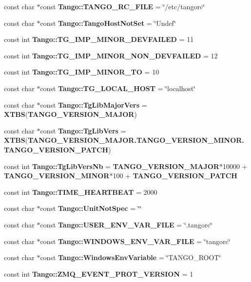 \begin{DoxyCompactItemize}
\item 
const char $\ast$const {\bf Tango\-::\-T\-A\-N\-G\-O\-\_\-\-R\-C\-\_\-\-F\-I\-L\-E} = \char`\"{}/etc/tangorc\char`\"{}
\item 
const char $\ast$const {\bf Tango\-::\-Tango\-Host\-Not\-Set} = \char`\"{}Undef\char`\"{}
\item 
const int {\bf Tango\-::\-T\-G\-\_\-\-I\-M\-P\-\_\-\-M\-I\-N\-O\-R\-\_\-\-D\-E\-V\-F\-A\-I\-L\-E\-D} = 11
\item 
const int {\bf Tango\-::\-T\-G\-\_\-\-I\-M\-P\-\_\-\-M\-I\-N\-O\-R\-\_\-\-N\-O\-N\-\_\-\-D\-E\-V\-F\-A\-I\-L\-E\-D} = 12
\item 
const int {\bf Tango\-::\-T\-G\-\_\-\-I\-M\-P\-\_\-\-M\-I\-N\-O\-R\-\_\-\-T\-O} = 10
\item 
const char $\ast$const {\bf Tango\-::\-T\-G\-\_\-\-L\-O\-C\-A\-L\-\_\-\-H\-O\-S\-T} = \char`\"{}localhost\char`\"{}
\item 
const char $\ast$const {\bf Tango\-::\-Tg\-Lib\-Major\-Vers} = {\bf X\-T\-B\-S}({\bf T\-A\-N\-G\-O\-\_\-\-V\-E\-R\-S\-I\-O\-N\-\_\-\-M\-A\-J\-O\-R})
\item 
const char $\ast$const {\bf Tango\-::\-Tg\-Lib\-Vers} = {\bf X\-T\-B\-S}({\bf T\-A\-N\-G\-O\-\_\-\-V\-E\-R\-S\-I\-O\-N\-\_\-\-M\-A\-J\-O\-R.\-T\-A\-N\-G\-O\-\_\-\-V\-E\-R\-S\-I\-O\-N\-\_\-\-M\-I\-N\-O\-R.\-T\-A\-N\-G\-O\-\_\-\-V\-E\-R\-S\-I\-O\-N\-\_\-\-P\-A\-T\-C\-H})
\item 
const int {\bf Tango\-::\-Tg\-Lib\-Vers\-Nb} = {\bf T\-A\-N\-G\-O\-\_\-\-V\-E\-R\-S\-I\-O\-N\-\_\-\-M\-A\-J\-O\-R}$\ast$10000 + {\bf T\-A\-N\-G\-O\-\_\-\-V\-E\-R\-S\-I\-O\-N\-\_\-\-M\-I\-N\-O\-R}$\ast$100 + {\bf T\-A\-N\-G\-O\-\_\-\-V\-E\-R\-S\-I\-O\-N\-\_\-\-P\-A\-T\-C\-H}
\item 
const int {\bf Tango\-::\-T\-I\-M\-E\-\_\-\-H\-E\-A\-R\-T\-B\-E\-A\-T} = 2000
\item 
const char $\ast$const {\bf Tango\-::\-Unit\-Not\-Spec} = \char`\"{}\char`\"{}
\item 
const char $\ast$const {\bf Tango\-::\-U\-S\-E\-R\-\_\-\-E\-N\-V\-\_\-\-V\-A\-R\-\_\-\-F\-I\-L\-E} = \char`\"{}.tangorc\char`\"{}
\item 
const char $\ast$const {\bf Tango\-::\-W\-I\-N\-D\-O\-W\-S\-\_\-\-E\-N\-V\-\_\-\-V\-A\-R\-\_\-\-F\-I\-L\-E} = \char`\"{}tangorc\char`\"{}
\item 
const char $\ast$const {\bf Tango\-::\-Windows\-Env\-Variable} = \char`\"{}T\-A\-N\-G\-O\-\_\-\-R\-O\-O\-T\char`\"{}
\item 
const int {\bf Tango\-::\-Z\-M\-Q\-\_\-\-E\-V\-E\-N\-T\-\_\-\-P\-R\-O\-T\-\_\-\-V\-E\-R\-S\-I\-O\-N} = 1
\end{DoxyCompactItemize}


